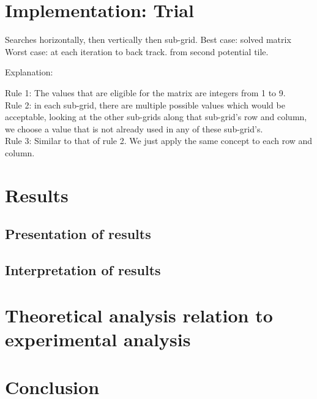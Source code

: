 \documentclass[12pt]{article}
\begin{document}
\section{Implementation: Trial}
\begin{flushleft}
Searches horizontally, then vertically then sub-grid. 
Best case: solved matrix
Worst case: at each iteration to back track. from second potential tile. 

\end{flushleft}

\begin{flushleft}
Explanation:
\end{flushleft}  
Rule 1: The values that are  eligible for the matrix are integers from 1 to 9.\\
Rule 2: in each sub-grid, there are multiple possible values which would be acceptable, looking at the other sub-grids along that sub-grid's row and column, we choose a value that is not already used in any of these sub-grid's. \\
Rule 3: Similar to that of rule 2. We just apply the same concept to each row and column. 

\section{Results}
\subsection{Presentation of results}
\subsection{Interpretation of results}
\section{Theoretical analysis relation to experimental analysis}
\section{Conclusion}
\end{document}
